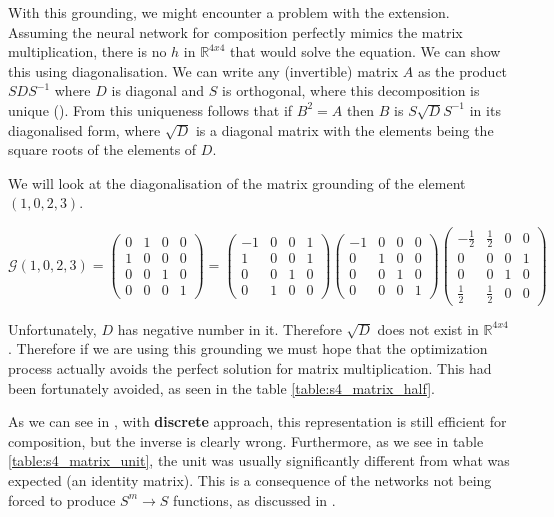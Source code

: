 With this grounding, we might encounter a problem with the extension. Assuming the neural network for composition perfectly mimics the matrix multiplication, there is no $h$ in $\mathbb{R}^{4x4}$ that would solve the equation. We can show this using diagonalisation. We can write any (invertible) matrix $A$ as the product $SDS^{-1}$ where $D$ is diagonal and $S$ is orthogonal, where this decomposition is unique (\cite{Lingebra}). From this uniqueness follows that if $B^2=A$ then $B$ is $S\sqrt{D}S^{-1}$ in its diagonalised form, where $\sqrt{D}$ is a diagonal matrix with the elements being the square roots of the elements of $D$. 

We will look at the diagonalisation of the matrix grounding of the element $(1,0,2,3)$.

$$\mathcal{G}(1,0,2,3)=
\left(\begin{matrix}
	0&1&0&0\\
	1&0&0&0\\
	0&0&1&0\\
	0&0&0&1
\end{matrix}\right)
=
\left(\begin{matrix}
	-1&0&0&1\\
	1&0&0&1\\
	0&0&1&0\\
	0&1&0&0
\end{matrix}\right)
\left(\begin{matrix}
	-1&0&0&0\\
	0&1&0&0\\
	0&0&1&0\\
	0&0&0&1
\end{matrix}\right)
\left(\begin{matrix}
	-\frac{1}{2}&\frac{1}{2}&0&0\\
	0&0&0&1\\
	0&0&1&0\\
	\frac{1}{2}&\frac{1}{2}&0&0
\end{matrix}\right)
$$

Unfortunately, $D$ has negative number in it. Therefore $\sqrt{D}$ does not exist in $\mathbb{R}^{4x4}$. Therefore if we are using this grounding we must hope that the optimization process actually avoids the perfect solution for matrix multiplication. This had been fortunately avoided, as seen in the table \ref{table:s4_matrix_half}.

As we can see in , with \textbf{discrete} approach, this representation is still  efficient for composition, but the inverse is clearly wrong. Furthermore, as we see in table \ref{table:s4_matrix_unit}, the unit was usually significantly different from what was expected (an identity matrix). This is a consequence of the networks not being forced to produce $S^m\rightarrow S$ functions, as discussed in .

